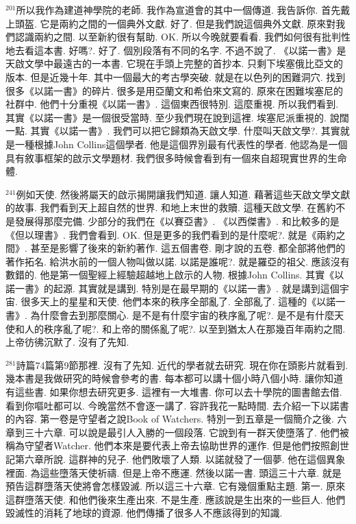 \documentclass{book}
\begin{document}
$^{201}$所以我作為建道神學院的老師.
我作為宣道會的其中一個傳道.
我告訴你.
首先戴上頭盔.
它是兩約之間的一個典外文獻.
好了.
但是我們說這個典外文獻.
原來對我們認識兩約之間.
以至新約很有幫助.
OK.
所以今晚就要看看.
我們如何很有批判性地去看這本書.
好嗎?.
好了.
個別段落有不同的名字.
不過不說了.
《以諾一書》是天啟文學中最遠古的一本書.
它現在手頭上完整的首抄本.
只剩下埃塞俄比亞文的版本.
但是近幾十年.
其中一個最大的考古學突破.
就是在以色列的困難洞穴.
找到很多《以諾一書》的碎片.
很多是用亞蘭文和希伯來文寫的.
原來在困難埃塞尼的社群中.
他們十分重視《以諾一書》.
這個東西很特別.
這麼重視.
所以我們看到.
其實《以諾一書》是一個很受當時.
至少我們現在說到這裡.
埃塞尼派重視的.
說闊一點.
其實《以諾一書》.
我們可以把它歸類為天啟文學.
什麼叫天啟文學?.
其實就是一種根據John Collins這個學者.
他是這個界別最有代表性的學者.
他認為是一個具有敘事框架的啟示文學題材.
我們很多時候會看到有一個來自超現實世界的生命體.

$^{241}$例如天使.
然後將屬天的啟示揭開讓我們知道.
讓人知道.
藉著這些天啟文學文獻的故事.
我們看到天上超自然的世界.
和地上末世的救贖.
這種天啟文學.
在舊約不是發展得那麼完備.
少部分的我們在《以賽亞書》.
《以西傑書》.
和比較多的是《但以理書》.
我們會看到.
OK.
但是更多的我們看到的是什麼呢?.
就是《兩約之間》.
甚至是影響了後來的新約著作.
這五個書卷.
剛才說的五卷.
都全部將他們的著作拓名.
給洪水前的一個人物叫做以諾.
以諾是誰呢?.
就是羅亞的祖父.
應該沒有數錯的.
他是第一個聖經上經驗超越地上啟示的人物.
根據John Collins.
其實《以諾一書》的起源.
其實就是講到.
特別是在最早期的《以諾一書》.
就是講到這個宇宙.
很多天上的星星和天使.
他們本來的秩序全部亂了.
全部亂了.
這種的《以諾一書》.
為什麼會去到那麼關心.
是不是有什麼宇宙的秩序亂了呢?.
是不是有什麼天使和人的秩序亂了呢?.
和上帝的關係亂了呢?.
以至到猶太人在那幾百年兩約之間.
上帝彷彿沉默了.
沒有了先知.

$^{281}$詩篇74篇第9節那裡.
沒有了先知.
近代的學者就去研究.
現在你在頭影片就看到.
幾本書是我做研究的時候會參考的書.
每本都可以講十個小時八個小時.
讓你知道有這些書.
如果你想去研究更多.
這裡有一大堆書.
你可以去十學院的圖書館去借.
看到你嘔吐都可以.
今晚當然不會逐一講了.
容許我花一點時間.
去介紹一下以諾書的內容.
第一卷是守望者之說Book of Watchers.
特別一到五章是一個簡介之後.
六章到三十六章.
可以說是最引人入勝的一個段落.
它說到有一群天使墮落了.
他們被稱為守望者Watcher.
他們本來是要代表上帝去協助世界的運作.
但是他們按照創世記第六章所說.
這群神的兒子.
他們敗壞了人類.
以諾就發了一個夢.
他在這個異象裡面.
為這些墮落天使祈禱.
但是上帝不應運.
然後以諾一書.
頭這三十六章.
就是預告這群墮落天使將會怎樣毀滅.
所以這三十六章.
它有幾個重點主題.
第一.
原來這群墮落天使.
和他們後來生產出來.
不是生產.
應該說是生出來的一些巨人.
他們毀滅性的消耗了地球的資源.
他們傳播了很多人不應該得到的知識.
\end{document}
